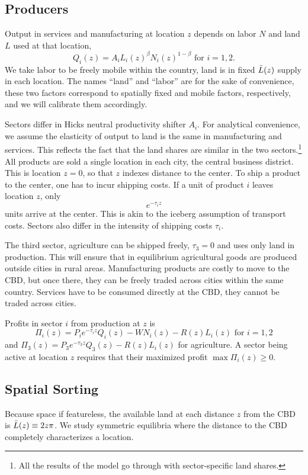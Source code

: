 \documentclass[12pt]{article}
\begin{document}
\subsection{Producers}
Output in services and manufacturing at location $z$ depends on labor $N$ and land $L$ used at that location,
\[
Q_i(z) = A_i L_i(z)^{\beta}N_i(z)^{1-\beta}\text{ for }i=1,2.
\]
We take labor to be freely mobile within the country, land is in fixed $\Bar{L}(z)$ supply in each location. The names ``land'' and ``labor'' are for the sake of convenience, these two factors correspond to spatially fixed and mobile factors, respectively, and we will calibrate them accordingly.

Sectors differ in Hicks neutral productivity shifter $A_i$. For analytical convenience, we assume the elasticity of output to land is the same in manufacturing and services. This reflects the fact that the land shares are similar in the two sectors.\footnote{All the results of the model go through with sector-specific land shares.}
All products are sold a single location in each city, the central business district. This is location $z=0$, so that $z$ indexes distance to the center.
To ship a product to the center, one has to incur shipping costs. If a unit of product $i$ leaves location $z$, only
\[
e^{-\tau_i z}
\]
units arrive at the center. This is akin to the iceberg assumption of transport costs. Sectors also differ in the intensity of shipping costs $\tau_i$. 

The third sector, agriculture can be shipped freely, $\tau_3=0$ and uses only land in production. This will ensure that in equilibrium agricultural goods are produced outside cities in rural areas. Manufacturing products are costly to move to the CBD, but once there, they can be freely traded across cities within the same country. Services have to be consumed directly at the CBD, they cannot be traded across cities.

Profits in sector $i$ from production at $z$ is
\begin{equation}
\label{eq:profit}
\Pi_i(z)=P_ie^{-\tau_iz}Q_i(z)-WN_i(z)-R(z)L_i(z)\text{ for }i=1,2
\end{equation}
and $\Pi_3(z)=P_3e^{-\tau_3z}Q_3(z)-R(z)L_i(z)$ for agriculture. A sector being active at location $z$ requires that their maximized profit $\max\Pi_i(z)\geq0.$

\subsection{Spatial Sorting}
Because space if featureless, the available land at each distance $z$ from the CBD is $\Bar L(z) \equiv 2z\pi$. We study symmetric equilibria where the distance to the CBD completely characterizes a location.
\end{document}

